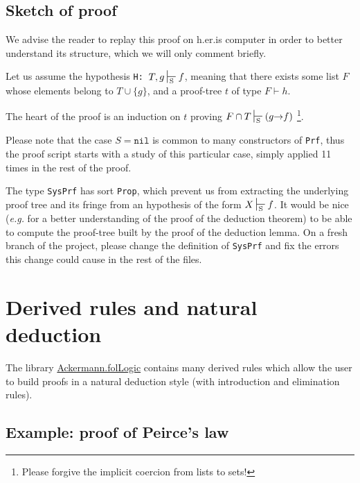 
\subsection{Sketch of proof}

We advise the reader to replay this proof on h.er.is computer
 in order to better understand its structure, which we will only comment briefly.

Let us assume the hypothesis \texttt{H: $T, g \sdash f$},
meaning that there exists some list $F$ whose elements 
belong to $T \cup \{g\}$, and a proof-tree $t$ of type
$F \vdash h$.

The heart of the proof is an induction on $t$ proving 
$F \cap T \sdash (g\arrow f)$ \footnote{Please forgive the implicit coercion from lists to sets!}. 

Please note that the case $S=\texttt{nil}$ is common to 
many constructors of \texttt{Prf}, thus the proof script starts
with a study of this particular case, simply applied 11 times in the rest of the proof. 


\begin{project}[**]
  The type \texttt{SysPrf} has sort \texttt{Prop}, which prevent us from
extracting the underlying proof tree and its fringe from an hypothesis 
of the form $X\sdash f$. 
It would be nice (\emph{e.g.} for a better understanding of the proof of the deduction theorem) to be able to compute the  proof-tree built
by the proof of the deduction lemma. 
On a fresh branch of the project, please change the definition of
\texttt{SysPrf} and fix the errors this change could cause in the rest of the files. 
\end{project}




\section{Derived rules and natural deduction}


 The library 
 \href{../theories/html/hydras.Ackermann.folLogic.html}{Ackermann.folLogic} contains many derived rules which allow the user to build proofs in a natural deduction style (with introduction and elimination rules).

\subsection{Example: proof of Peirce's law}

